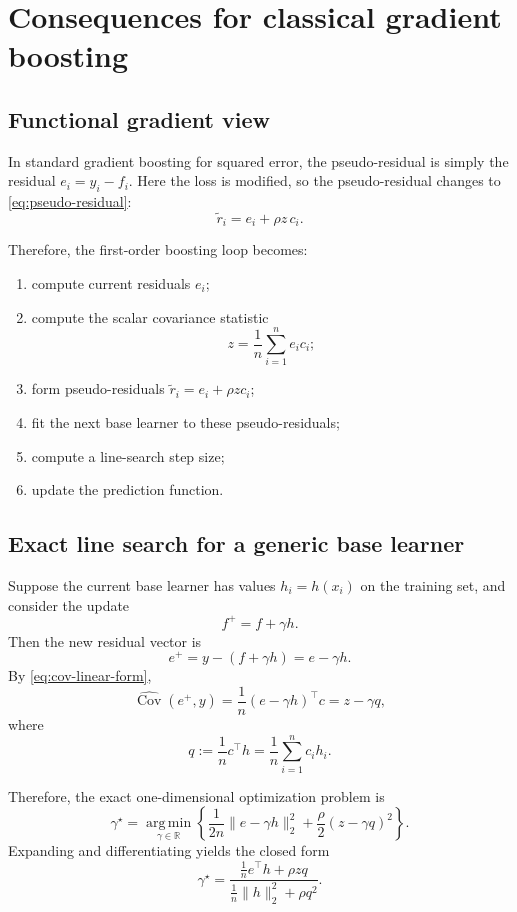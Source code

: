 \documentclass[11pt]{article}
\newcommand{\R}{\mathbb{R}}
\newcommand{\1}{\mathbf{1}}
\newcommand{\Cov}{\operatorname{Cov}}
\newcommand{\argmin}{\operatorname*{arg\,min}}
\begin{document}
\section{Consequences for classical gradient boosting}

\subsection{Functional gradient view}

In standard gradient boosting for squared error, the pseudo-residual is simply the residual $e_i = y_i-f_i$. Here the loss is modified, so the pseudo-residual changes to \eqref{eq:pseudo-residual}:
\[
\widetilde r_i = e_i + \rho z\,c_i.
\]

Therefore, the first-order boosting loop becomes:
\begin{enumerate}[leftmargin=2em]
\item compute current residuals $e_i$;
\item compute the scalar covariance statistic
\[
z = \frac{1}{n}\sum_{i=1}^n e_i c_i;
\]
\item form pseudo-residuals $\widetilde r_i = e_i + \rho z c_i$;
\item fit the next base learner to these pseudo-residuals;
\item compute a line-search step size;
\item update the prediction function.
\end{enumerate}

\subsection{Exact line search for a generic base learner}

Suppose the current base learner has values $h_i = h(x_i)$ on the training set, and consider the update
\[
f^{+} = f + \gamma h.
\]
Then the new residual vector is
\[
e^{+} = y - (f+\gamma h) = e - \gamma h.
\]
By \eqref{eq:cov-linear-form},
\[
\widehat{\Cov}(e^{+},y)
=
\frac{1}{n}(e-\gamma h)^\top c
=
z - \gamma q,
\]
where
\begin{equation}
\label{eq:def-q}
q := \frac{1}{n}c^\top h = \frac{1}{n}\sum_{i=1}^n c_i h_i.
\end{equation}

Therefore, the exact one-dimensional optimization problem is
\begin{equation}
\label{eq:line-search-problem}
\gamma^\star
=
\argmin_{\gamma \in \R}
\left\{
\frac{1}{2n}\|e-\gamma h\|_2^2
+
\frac{\rho}{2}(z-\gamma q)^2
\right\}.
\end{equation}
Expanding and differentiating yields the closed form
\begin{equation}
\label{eq:line-search-closed-form}
\gamma^\star
=
\frac{\frac{1}{n}e^\top h + \rho z q}
{\frac{1}{n}\|h\|_2^2 + \rho q^2}.
\end{equation}
\end{document}
